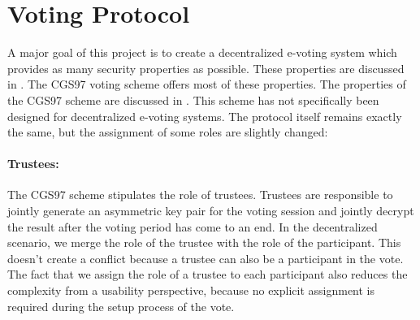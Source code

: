 \documentclass[numbers=noenddot, abstract=on, a4paper, headsepline,
footsepline, oneside, draft=off]{scrreprt}
\begin{document}
% 

\section{Voting Protocol}
\label{sec:votingprotocol}
A major goal of this project is to create a decentralized e-voting system which
provides as many security properties as possible. These
properties are discussed in . The CGS97 voting scheme
\cite{CGS97} offers most of these properties. The properties of the CGS97 scheme
are discussed in . This scheme has not specifically been
designed for decentralized e-voting systems. The protocol itself remains exactly
the same, but the assignment of some roles are slightly changed:

\paragraph{Trustees:} The CGS97 scheme stipulates the role of trustees. Trustees
are responsible to jointly generate an asymmetric key pair for the voting
session and jointly decrypt the result after the voting period has come to an end. In the
decentralized scenario, we merge the role of the trustee with the role of the
participant. This doesn't create a conflict because a trustee can also be a
participant in the vote. The fact that we assign the role of a trustee to each
participant also reduces the complexity from a usability perspective, because no
explicit assignment is required during the setup process of the vote.
\end{document}
